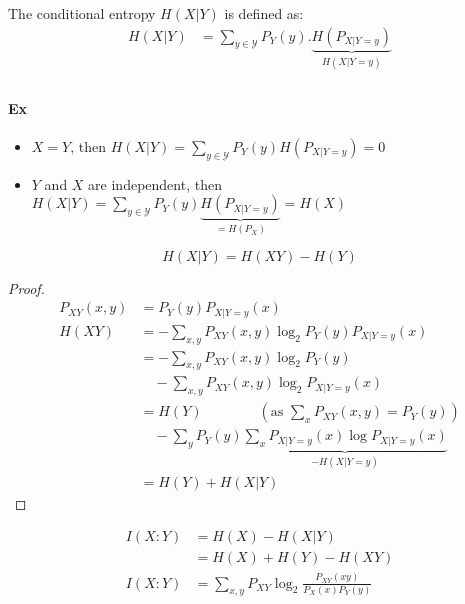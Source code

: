 \begin{defi}
The conditional entropy $H(X|Y)$ is defined as:
\begin{align*}
H(X|Y) & =\sum_{y\in \mathcal{Y}} P_Y(y).\underbrace{H(P_{X|Y=y})}_{H(X|Y=y)}\\
\end{align*}
\end{defi}

\paragraph{Ex}
\begin{itemize}
\item $X=Y$, then $H(X|Y)=\sum_{y\in \mathcal{Y}}P_Y(y)H(P_{X|Y=y})=0$
\item $Y$ and $X$ are independent, then $H(X|Y)=\sum_{y\in \mathcal{Y}} P_Y(y)\underbrace{H(P_{X|Y=y})}_{=H(P_X)}=H(X)$
\end{itemize}

\begin{prop}
\begin{equation*}
H(X|Y)=H(XY)-H(Y)
\end{equation*}
\end{prop}

\begin{proof}
\begin{align*}
P_{XY}(x,y) & = P_Y(y)P_{X|Y=y}(x)\\
H(XY) & = - \sum_{x,y} P_{XY}(x,y) \log_2 P_Y (y) P_{X|Y=y}(x)\\
& = - \sum_{x,y} P_{XY} (x,y) \log_2 P_Y(y)\\
& \quad - \sum_{x,y} P_{XY}(x,y) \log_2 P_{X|Y=y}(x)\\
&=H(Y) \qquad \qquad \left(\text{as } \sum_x P_{XY}(x,y)=P_Y(y) \right)\\
& \quad - \sum_y P_Y(y)\underbrace{\sum_x P_{X|Y=y}(x)\log P_{X|Y=y}(x)}_{-H(X|Y=y)}\\
& =H(Y) + H(X|Y)
\end{align*}
\end{proof}

\begin{defi}
\begin{align*}
I(X:Y) & = H(X) - H(X|Y)\\
&= H(X) + H(Y) - H(XY)\\
I(X:Y) & = \sum_{x,y}P_{XY}\log_2 \frac{P_{XY} (xy)}{P_X(x)P_Y(y)}
\end{align*}
\end{defi}

